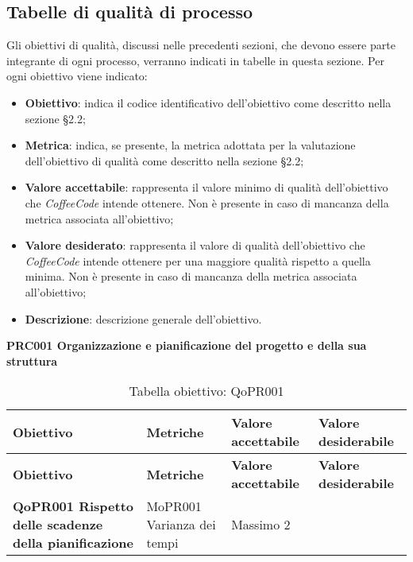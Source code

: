 \documentclass[../piano-di-qualifica.tex]{subfiles}
\begin{document}
\subsection{Tabelle di qualità di processo}
\label{sub:tabelle_di_qualita_di_processo}
Gli obiettivi di qualità, discussi nelle precedenti sezioni, che devono essere parte integrante di ogni processo, verranno indicati in tabelle in questa sezione.
Per ogni obiettivo viene indicato:

\begin{itemize}
   \item \textbf{Obiettivo}: indica il codice identificativo dell'obiettivo come descritto nella sezione §2.2;
   \item \textbf{Metrica}: indica, se presente, la metrica adottata per la valutazione dell'obiettivo di qualità come descritto nella sezione §2.2;
   \item \textbf{Valore accettabile}: rappresenta il valore minimo di qualità dell'obiettivo che \emph{CoffeeCode} intende ottenere. Non è presente in caso di mancanza della metrica associata all'obiettivo;
   \item \textbf{Valore desiderato}: rappresenta il valore di qualità dell'obiettivo che \emph{CoffeeCode} intende ottenere per una maggiore qualità rispetto a quella minima. Non è presente in caso di mancanza della metrica associata all'obiettivo;
   \item \textbf{Descrizione}: descrizione generale dell'obiettivo.
\end{itemize}

\begin{center}
    \centering
    \textbf{PRC001 Organizzazione e pianificazione del progetto e della sua struttura}
\end{center}

\renewcommand{\arraystretch}{2} %
\begin{longtable}[H]{>{\centering\bfseries}m{5cm} >{\centering}m{5cm} >{\centering}m{2.5cm} >{\centering\arraybackslash}m{2.5cm}}  
    \caption{Tabella obiettivo: QoPR001}%
    \label{tab:obiettivo_qopr001} \\
  \rowcolor{lightgray}
  {\textbf{Obiettivo}} & {\textbf{Metriche}} & {\textbf{Valore accettabile}} & {\textbf{Valore desiderabile}}  \\
  \endfirsthead%
  \rowcolor{lightgray}
  {\textbf{Obiettivo}} & {\textbf{Metriche}} & {\textbf{Valore accettabile}} & {\textbf{Valore desiderabile}}  \\
  \endhead%
  \textbf{QoPR001 Rispetto delle scadenze della pianificazione} & MoPR001 Varianza dei tempi & Massimo 2 & 0 \\
\end{longtable}
\end{document}
